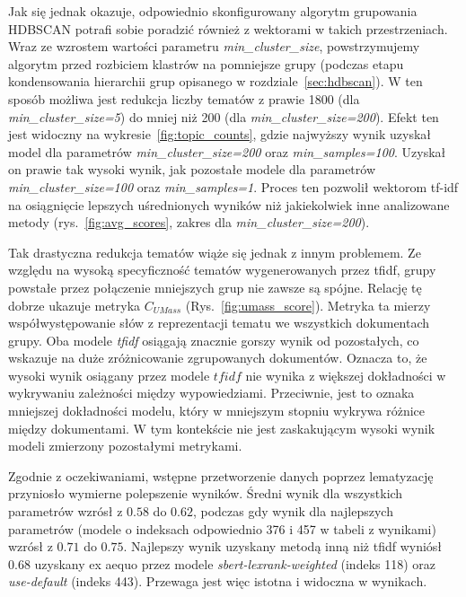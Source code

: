 		Jak się jednak okazuje, odpowiednio skonfigurowany algorytm grupowania HDBSCAN potrafi sobie poradzić również z wektorami w takich przestrzeniach.
		Wraz ze wzrostem wartości parametru \emph{min\_cluster\_size}, powstrzymujemy algorytm przed rozbiciem klastrów na pomniejsze grupy
			(podczas etapu kondensowania hierarchii grup opisanego w rozdziale~\ref{sec:hdbscan}).
		W ten sposób możliwa jest redukcja liczby tematów z prawie 1800 (dla \emph{min\_cluster\_size=5}) do mniej niż 200 (dla \emph{min\_cluster\_size=200}).
		Efekt ten jest widoczny na wykresie~\ref{fig:topic_counts}, gdzie najwyższy wynik uzyskał model dla parametrów \emph{min\_cluster\_size=200} oraz \emph{min\_samples=100}.
		Uzyskał on prawie tak wysoki wynik, jak pozostałe modele dla parametrów \emph{min\_cluster\_size=100} oraz \emph{min\_samples=1}.
		Proces ten pozwolił wektorom tf-idf na osiągnięcie lepszych uśrednionych wyników niż jakiekolwiek inne analizowane metody (rys.~\ref{fig:avg_scores}, zakres dla \emph{min\_cluster\_size=200}).

		Tak drastyczna redukcja tematów wiąże się jednak z innym problemem.
		Ze względu na wysoką specyficzność tematów wygenerowanych przez tfidf, grupy powstałe przez połączenie mniejszych grup nie zawsze są spójne.
		Relację tę dobrze ukazuje metryka \(C_{UMass}\) (Rys.~\ref{fig:umass_score}).
		Metryka ta mierzy współwystępowanie słów z reprezentacji tematu we wszystkich dokumentach grupy.
		Oba modele \emph{tfidf} osiągają znacznie gorszy wynik od pozostałych, co wskazuje na duże zróżnicowanie zgrupowanych dokumentów.
		Oznacza to, że wysoki wynik osiągany przez modele \(tfidf\) nie wynika z większej dokładności w wykrywaniu zależności między wypowiedziami.
		Przeciwnie, jest to oznaka mniejszej dokładności modelu, który w mniejszym stopniu wykrywa różnice między dokumentami.
		W tym kontekście nie jest zaskakującym wysoki wynik modeli zmierzony pozostałymi metrykami.

		Zgodnie z oczekiwaniami, wstępne przetworzenie danych poprzez lematyzację przyniosło wymierne polepszenie wyników.
		Średni wynik dla wszystkich parametrów wzrósł z \(0.58\) do \(0.62\),
			podczas gdy wynik dla najlepszych parametrów (modele o indeksach odpowiednio 376 i 457 w tabeli z wynikami) wzrósł z \(0.71\) do \(0.75\).
		Najlepszy wynik uzyskany metodą inną niż tfidf wyniósł \(0.68\) uzyskany ex aequo przez modele \emph{sbert-lexrank-weighted} (indeks 118) oraz \emph{use-default} (indeks 443).
		Przewaga jest więc istotna i widoczna w wynikach.
		
